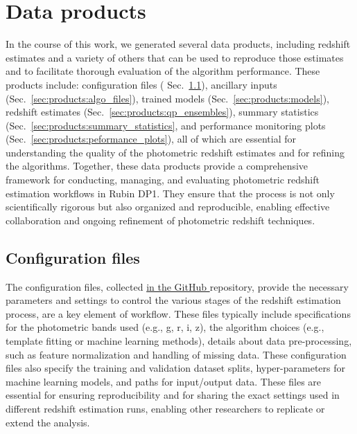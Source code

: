 
\section{Data products}
\label{sec:products:0}

In the course of this work, we generated several data products, including redshift estimates and a variety of others that can be used to reproduce those estimates and to facilitate thorough evaluation of the algorithm performance.  These products include: configuration files ( Sec.~\ref{sec:products:configuration}), ancillary inputs (Sec.~\ref{sec:products:algo_files}), trained models (Sec.~\ref{sec:products:models}), redshift estimates (Sec.~\ref{sec:products:qp_ensembles}), summary statistics (Sec.~\ref{sec:products:summary_statistics}, and performance monitoring plots (Sec.~\ref{sec:products:peformance_plots}), all of which are essential for understanding the quality of the photometric redshift estimates and for refining the algorithms.   Together, these data products provide a comprehensive framework for conducting, managing, and evaluating photometric redshift estimation workflows in Rubin DP1.  They ensure that the process is not only scientifically rigorous but also organized and reproducible, enabling effective collaboration and ongoing refinement of photometric redshift techniques.


\subsection{Configuration files}
\label{sec:products:configuration}

The configuration files, collected \href{https://github.com/lsstdesc/rail_project_config}{in the GitHub } repository, provide the necessary parameters and settings to control the various stages of the redshift estimation process, are a key element of  workflow.  These files typically include specifications for the photometric bands used (e.g., g, r, i, z), the algorithm choices (e.g., template fitting or machine learning methods), details about data pre-processing, such as feature normalization and handling of missing data.  These configuration files also specify the training and validation dataset splits, hyper-parameters for machine learning models, and paths for input/output data.  These files are essential for ensuring reproducibility and for sharing the exact settings used in different redshift estimation runs, enabling other researchers to replicate or extend the analysis. 


